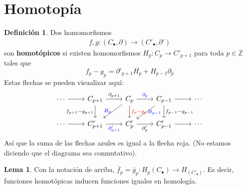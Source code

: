 \documentclass{book}
\theoremstyle{definition}
\newtheorem*{defn}{Definición}
\newtheorem*{lema}{Lema}
\newcommand{\Z}{\mathbb{Z}}
\begin{document}
	\section{Homotopía}
	\begin{defn}
		Dos homomorfismos 
		\begin{align*}
			f,g:(C_\bullet,\partial)\to(C'_\bullet,\partial')
		\end{align*}
		son \textbf{homotópicos} si existen homomorfismos $H_p:C_p\to C'_{p+1}$ para toda $p\in\Z$ tales que $$f_p-g_p=\partial'_{p+1}H_p+H_{p-1}\partial_p$$ Estas flechas se pueden visualizar aquí:
		\[
		\begin{tikzcd}
			\cdots \arrow{r} & C_{p+1} \arrow{r}{\partial_{p+1}} \arrow{d}[left]{f_{p+1}-g_{p+1}} & C_p \arrow{r}[blue]{\partial_p} \arrow{d}[right,red]{f_p-g_p} \arrow{ld}[left,blue]{H_p} & C_{p-1} \arrow{r} \arrow{d}[right]{f_{p-1}-g_{p-1}} \arrow{ld}[right,blue]{H_{p-1}} & \cdots \\
			\cdots \arrow{r} & C'_{p+1} \arrow{r}[below,blue]{\partial'_{p+1}} & C'_p \arrow{r}[below]{\partial_p'} & C'_{p-1} \arrow{r} & \cdots
		\end{tikzcd}
		\]
		Así que la suma de las flechas azules es igual a la flecha roja. (No estamos diciendo que el diagrama sea conmutativo).
	\end{defn}
	\begin{lema}
		Con la notación de arriba, $\bar f_p=\bar g_p:H_p(C_\bullet)\to H_(C'_\bullet)$. Es decir, funciones homotópicas inducen funciones iguales en homología.
	\end{lema}
\end{document}
